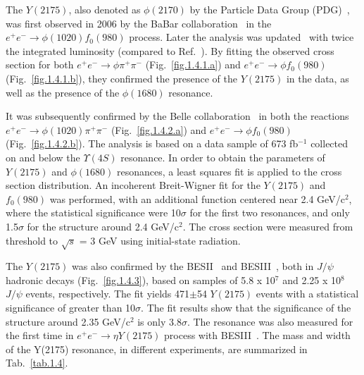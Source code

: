 The $Y(2175)$, also denoted as $\phi(2170)$ by the Particle Data Group (PDG)~\cite{Tanabashi18}, was first observed in 2006 by the BaBar collaboration~\cite{Aubert06} in the $e^{+}e^{-}\rightarrow \phi(1020)f_0(980)$ process. Later the analysis was updated~\cite{Aubert12} with twice the integrated luminosity (compared to Ref.~\cite{Aubert06}). By fitting the observed cross section for both $e^{+}e^{-}\rightarrow \phi \pi^{+} \pi^{-}$ (Fig.~\ref{fig.1.4.1.a}) and $e^{+}e^{-}\rightarrow \phi f_0(980)$ (Fig.~\ref{fig.1.4.1.b}), they confirmed the presence of the $Y(2175)$ in the data, as well as the presence of the $\phi(1680)$ resonance.
~\par It was subsequently confirmed by the Belle collaboration~\cite{Shen09} in both the reactions $e^{+}e^{-}\rightarrow \phi(1020)\pi^{+}\pi^{-}$ (Fig.~\ref{fig.1.4.2.a}) and $e^{+}e^{-}\rightarrow \phi f_0(980)$ (Fig.~\ref{fig.1.4.2.b}). The analysis is based on a data sample of 673 fb$^{-1}$ collected on and below the $\Upsilon(4S)$ resonance. In order to obtain the parameters of $Y(2175)$ and $\phi(1680)$ resonances, a least squares fit is applied to the cross section distribution. An incoherent Breit-Wigner fit for the $Y(2175)$ and $f_0(980)$ was performed, with an additional function centered near 2.4 GeV/c$^2$, where the statistical significance were 10$\sigma$ for the first two resonances, and only 1.5$\sigma$ for the structure around 2.4 GeV/c$^2$. The cross section were measured from threshold to $\sqrt{s}$ = 3 GeV using initial-state radiation.
~\par The $Y(2175)$ was also confirmed by the BESII~\cite{Ablikim08} and BESIII~\cite{Ablikim15}, both in $J/\psi$ hadronic decays (Fig.~\ref{fig.1.4.3}), based on samples of 5.8 x 10$^7$ and 2.25 x 10$^8$ $J/\psi$ events, respectively. The fit yields 471$\pm$54 $Y(2175)$ events with a statistical significance of greater than 10$\sigma$. The fit results show that the significance of the structure around 2.35 GeV/c$^2$ is only 3.8$\sigma$. The resonance was also measured for the first time in $e^{+}e^{-}\rightarrow \eta Y(2175)$ process with BESIII~\cite{Ablikim19}. The mass and width of the Y(2175) resonance, in different experiments, are summarized in Tab.~\ref{tab.1.4}.
